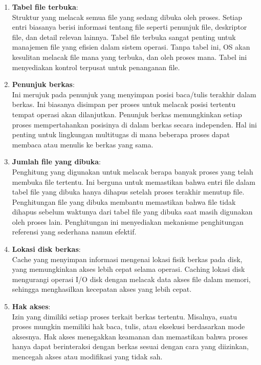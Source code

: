 \documentclass[12pt]{article}
\begin{document}
\begin{enumerate}
    \item \textbf{Tabel file terbuka}: \\
    Struktur yang melacak semua file yang sedang dibuka oleh proses. Setiap entri biasanya berisi informasi tentang file seperti penunjuk file, deskriptor file, dan detail relevan lainnya. Tabel file terbuka sangat penting untuk manajemen file yang efisien dalam sistem operasi. Tanpa tabel ini, OS akan kesulitan melacak file mana yang terbuka, dan oleh proses mana. Tabel ini menyediakan kontrol terpusat untuk penanganan file.

    \item \textbf{Penunjuk berkas}: \\
    Ini merujuk pada penunjuk yang menyimpan posisi baca/tulis terakhir dalam berkas. Ini biasanya disimpan per proses untuk melacak posisi tertentu tempat operasi akan dilanjutkan. Penunjuk berkas memungkinkan setiap proses mempertahankan posisinya di dalam berkas secara independen. Hal ini penting untuk lingkungan multitugas di mana beberapa proses dapat membaca atau menulis ke berkas yang sama.

    \item \textbf{Jumlah file yang dibuka}: \\
    Penghitung yang digunakan untuk melacak berapa banyak proses yang telah membuka file tertentu. Ini berguna untuk memastikan bahwa entri file dalam tabel file yang dibuka hanya dihapus setelah proses terakhir menutup file. Penghitungan file yang dibuka membantu memastikan bahwa file tidak dihapus sebelum waktunya dari tabel file yang dibuka saat masih digunakan oleh proses lain. Penghitungan ini menyediakan mekanisme penghitungan referensi yang sederhana namun efektif.

    \item \textbf{Lokasi disk berkas}: \\
    Cache yang menyimpan informasi mengenai lokasi fisik berkas pada disk, yang memungkinkan akses lebih cepat selama operasi. Caching lokasi disk mengurangi operasi I/O disk dengan melacak data akses file dalam memori, sehingga menghasilkan kecepatan akses yang lebih cepat.

    \item \textbf{Hak akses}: \\
    Izin yang dimiliki setiap proses terkait berkas tertentu. Misalnya, suatu proses mungkin memiliki hak baca, tulis, atau eksekusi berdasarkan mode aksesnya. Hak akses menegakkan keamanan dan memastikan bahwa proses hanya dapat berinteraksi dengan berkas sesuai dengan cara yang diizinkan, mencegah akses atau modifikasi yang tidak sah.
\end{enumerate}
\end{document}
